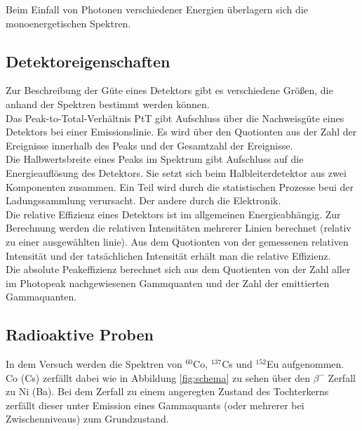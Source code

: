 Beim Einfall von Photonen verschiedener Energien überlagern sich die monoenergetischen Spektren.

\subsection{Detektoreigenschaften}
Zur Beschreibung der Güte eines Detektors gibt es verschiedene Größen, die anhand der Spektren bestimmt werden können. \\

Das Peak-to-Total-Verhältnis PtT gibt Aufschluss über die Nachweisgüte eines Detektors bei einer Emissionslinie. Es wird über den Quotionten aus der Zahl der Ereignisse innerhalb des Peaks und der Gesamtzahl der Ereignisse. \\

Die Halbwertsbreite eines Peaks im Spektrum gibt Aufschluss auf die Energieauflösung des Detektors. Sie setzt sich beim Halbleiterdetektor aus zwei Komponenten zusammen. Ein Teil wird durch die statistischen Prozesse beui der Ladungssammlung verursacht. Der andere durch die Elektronik.\\

Die relative Effizienz eines Detektors ist im allgemeinen Energieabhängig. Zur Berechnung werden die relativen Intensitäten mehrerer Linien berechnet (relativ zu einer ausgewählten linie). Aus dem Quotionten von der gemessenen relativen Intensität und der tatsächlichen Intensität erhält man die relative Effizienz.\\

Die absolute Peakeffizienz berechnet sich aus dem Quotienten von der Zahl aller im Photopeak nachgewiesenen Gammquanten und der Zahl der emittierten Gammaquanten. 

\subsection{Radioaktive Proben}
In dem Versuch werden die Spektren von $^{60}$Co, $^{137}$Cs und $^{152}$Eu aufgenommen. Co (Cs) zerfällt dabei wie in Abbildung \ref{fig:schema} zu sehen über den $\beta^-$ Zerfall zu Ni (Ba). Bei dem Zerfall zu einem angeregten Zustand des Tochterkerns zerfällt dieser unter Emission eines Gammaquants (oder mehrerer bei Zwischenniveaus) zum Grundzustand.


